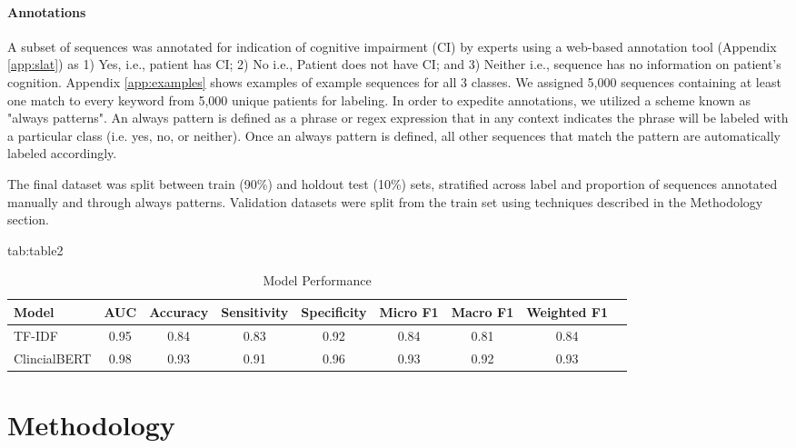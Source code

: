 \documentclass[pmlr,twocolumn,10pt]{jmlr} %
\begin{document}
\paragraph{Annotations}
\label{sec:Annotations} A subset of sequences was annotated for indication of cognitive impairment (CI) by experts using a web-based annotation tool (Appendix \ref{app:slat}) as 1) Yes, i.e., patient has CI; 2) No i.e., Patient does not have CI; and 3) Neither i.e., sequence has no information on patient’s cognition. Appendix \ref{app:examples} shows examples of example sequences for all 3 classes.  We assigned 5,000 sequences containing at least one match to every keyword from 5,000 unique patients for  labeling. In order to expedite annotations, we utilized a scheme known as "always patterns". An always pattern is defined as a phrase or regex expression that in any context indicates the phrase will be labeled with a particular class (i.e. yes, no, or neither). Once an always pattern is defined, all other sequences that match the pattern are automatically labeled accordingly.

The final dataset was split between train (90\%) and holdout test (10\%) sets, stratified across label and proportion of sequences annotated manually and through always patterns. %
Validation datasets were split from the train set using techniques described in the Methodology section. 

\begin{table*}[hbtp]
\floatconts
{tab:table2}
{\caption{Model Performance}}
\centering
  {
  \begin{tabular}{lcccccccc}
    \toprule 
    \bfseries Model & \bfseries AUC & \bfseries Accuracy & \bfseries Sensitivity & \bfseries Specificity & \bfseries Micro F1  & \bfseries Macro F1 & \bfseries Weighted F1 \\ 
    \midrule
    TF-IDF & 0.95 & 0.84 & 0.83 & 0.92 & 0.84 & 0.81 & 0.84 \\
    ClincialBERT & 0.98 & 0.93 & 0.91 & 0.96 & 0.93 & 0.92 & 0.93 \\
    \bottomrule
  \end{tabular}
  }

  \label{tab:modelperf}
\end{table*}

\section{Methodology}
\end{document}
